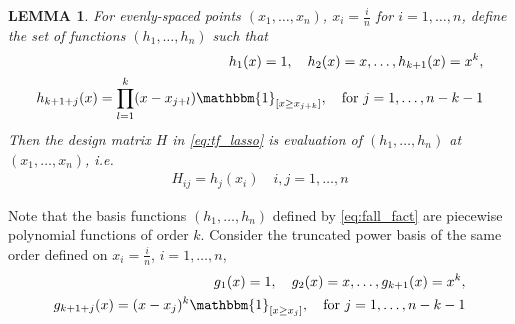 \documentclass[a4paper]{article}
\newtheorem{lemma}{LEMMA}
\begin{document}
\begin{lemma}
For evenly-spaced points $(x_1,\ldots, x_n)$, $x_i = \frac{i}{n}$ for $i=1,\ldots, n$, define the set of functions $(h_1, \ldots, h_n)$ such that
\begin{equation}
\begin{aligned}
h_1(x) = 1, \quad h_2(x) = x, \ldots, h_{k+1}(x) = x^k,\\
h_{k+1+j}(x) = \prod_{l=1}^k (x-x_{j+l})\mathbbm{1}_{[x\geq x_{j+k}]}, \quad \text{for } j = 1,\ldots, n-k-1
\label{eq:fall_fact}
\end{aligned}
\end{equation}
Then the design matrix $H$ in \eqref{eq:tf_lasso} is evaluation of $(h_1,\ldots, h_n)$ at $(x_1,\ldots, x_n)$, i.e.
\begin{align*}
H_{ij} = h_j(x_i) \quad i,j=1,\ldots, n
\end{align*}
\label{lemma:cont_tf}
\end{lemma}
Note that the basis functions $(h_1,\ldots, h_n)$ defined by \eqref{eq:fall_fact} are piecewise polynomial functions of order $k$. Consider the truncated power basis of the same order defined on $x_i = \frac{i}{n}$, $i= 1,\ldots, n$,
\begin{equation}
\begin{aligned}
g_1(x) = 1, \quad g_2(x) = x, \ldots, g_{k+1}(x) = x^k,\\
g_{k+1+j}(x) = (x-x_j)^k\mathbbm{1}_{[x\geq x_j]}, \quad \text{for }j=1,\ldots, n-k-1
\label{eq:trun_basis}
\end{aligned}
\end{equation}
\end{document}
